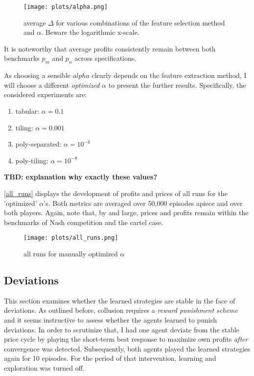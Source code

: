 \begin{figure}
	\texttt{[image: plots/alpha.png]}
	\caption{average $\Delta$ for various combinations of the feature selection method and $\alpha$. Beware the logarithmic x-scale.}
	\label{alpha}
\end{figure}

It is noteworthy that average profits consistently remain between both benchmarks $p_m$ and $p_n$ across specifications.


As choosing a sensible $alpha$ clearly depends on the feature extraction method, I will choose a different \emph{optimized} $\alpha$ to present the further results. Specifically, the considered experiments are:

\begin{enumerate}
	\item tabular: $\alpha = 0.1$
	\item tiling: $\alpha = 0.001$
	\item poly-separated: $\alpha = 10^{-6}$
	\item poly-tiling: $\alpha = 10^{-8}$
\end{enumerate}

\textbf{TBD: explanation why exactly these values?}

\autoref{all_runs} displays the development of profits and prices of all runs for the 'optimized' $\alpha$'s. Both metrics are averaged over 50,000 episodes apiece and over both players. Again, note that, by and large, prices and profits remain within the benchmarks of Nash competition and the cartel case.

\begin{figure}
	\texttt{[image: plots/all\_runs.png]}
	\caption{all runs for manually optimized $\alpha$}
	\label{all_runs}
\end{figure}



\clearpage
\subsection{Deviations}

This section examines whether the learned strategies are stable in the face of deviations. As outlined before, collusion requires a \emph{reward punishment scheme} and it seems instructive to assess whether the agents learned to punish deviations. In order to scrutinize that, I had one agent deviate from the stable price cycle by playing the short-term best response to maximize own profits \emph{after} convergence was detected. Subsequently, both agents played the learned strategies again for 10 episodes. For the period of that intervention, learning and exploration was turned off.

